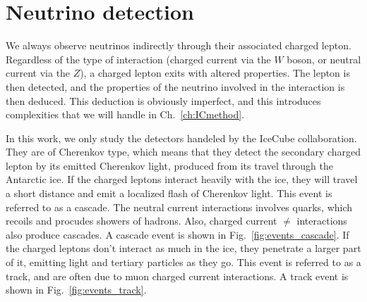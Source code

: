 % 
% 
\section{Neutrino detection}
We always observe neutrinos indirectly through their associated charged lepton. Regardless of the type of interaction (charged current via the $W$ boson, or neutral current
via the $Z$), a charged lepton exits with altered properties. The lepton is then detected, and the properties of the neutrino involved in the 
interaction is then deduced. This deduction is obviously imperfect, and this introduces complexities that we will handle in Ch.~\ref{ch:ICmethod}. 

In this work, we only study the detectors handeled by the IceCube collaboration. They are of Cherenkov type, which means that they detect 
the secondary charged lepton by its emitted Cherenkov light, produced from its travel through the Antarctic ice. 
If the charged leptons interact heavily with the ice, they will travel a short distance and emit a localized flash of 
Cherenkov light. This event is referred to as a cascade. The neutral current interactions involves quarks, which recoils and procudes
showers of hadrons. Also, charged current $\ne$ interactions also produce cascades. A cascade event 
is shown in Fig.~\ref{fig:events_cascade}.
If the charged leptons don't interact as much in the ice, they penetrate a larger part of it, emitting light and tertiary particles
as they go. This event is referred to as a track, and are often due to muon charged current interactions. A track event 
is shown in Fig.~\ref{fig:events_track}.

